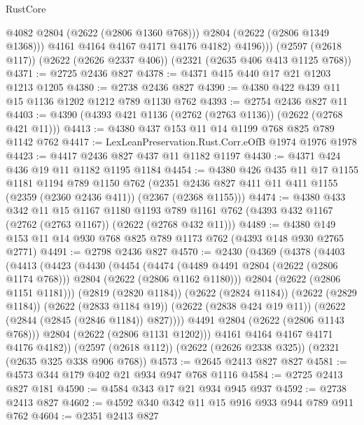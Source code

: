 \begin{lexlean}{RustCore}
\begin{coremodule}
                @4082
                @2804
                (@2622 (@2806 @1360 @768)))
              @2804
              (@2622 (@2806 @1349 @1368)))
            @4161
            @4164
            @4167
            @4171
            @4176
            @4182)
          @4196)))
    (@2597 (@2618 @117))
    (@2622 (@2626 @2337 @406))
    (@2321 (@2635 @406 @413 @1125 @768))
@4371 := @2725 @2436 @827
@4378 := @4371 @415 @440 @17 @21 @1203 @1213 @1205
@4380 := @2738 @2436 @827
@4390 := @4380 @422 @439 @11 @15 @1136 @1202 @1212 @789 @1130 @762
@4393 := @2754 @2436 @827 @11
@4403 := @4390 (@4393 @421 @1136 (@2762 (@2763 @1136)) (@2622 (@2768 @421 @11)))
@4413 := @4380 @437 @153 @11 @14 @1199 @768 @825 @789 @1142 @762
@4417 := LexLeanPreservation.Rust.Corr.eOfB @1974 @1976 @1978
@4423 := @4417 @2436 @827 @437 @11 @1182 @1197
@4430 := @4371 @424 @436 @19 @11 @1182 @1195 @1184
@4454 := @4380
    @426
    @435
    @11
    @17
    @1155
    @1181
    @1194
    @789
    @1150
    @762
    (@2351 @2436 @827 @411 @11 @411 @1155 (@2359 (@2360 @2436 @411)) (@2367 (@2368 @1155)))
@4474 := @4380
    @433
    @342
    @11
    @15
    @1167
    @1180
    @1193
    @789
    @1161
    @762
    (@4393 @432 @1167 (@2762 (@2763 @1167)) (@2622 (@2768 @432 @11)))
@4489 := @4380 @149 @153 @11 @14 @930 @768 @825 @789 @1173 @762 (@4393 @148 @930 @2765 @2771)
@4491 := @2798 @2436 @827
@4570 := @2430
    (@4369
      (@4378
        (@4403
          (@4413
            (@4423
              (@4430
                (@4454
                  (@4474
                    (@4489 @4491 @2804 (@2622 (@2806 @1174 @768)))
                    @2804
                    (@2622 (@2806 @1162 @1180)))
                  @2804
                  (@2622 (@2806 @1151 @1181)))
                (@2819 (@2820 @1184))
                (@2622 (@2824 @1184))
                (@2622 (@2829 @1184))
                (@2622 (@2833 @1184 @19))
                (@2622 (@2838 @424 @19 @11))
                (@2622 (@2844 (@2845 (@2846 @1184)) @827))))
            @4491
            @2804
            (@2622 (@2806 @1143 @768)))
          @2804
          (@2622 (@2806 @1131 @1202)))
        @4161
        @4164
        @4167
        @4171
        @4176
        @4182))
    (@2597 (@2618 @112))
    (@2622 (@2626 @2338 @325))
    (@2321 (@2635 @325 @338 @906 @768))
@4573 := @2645 @2413 @827 @827
@4581 := @4573 @344 @179 @402 @21 @934 @947 @768 @1116
@4584 := @2725 @2413 @827 @181
@4590 := @4584 @343 @17 @21 @934 @945 @937
@4592 := @2738 @2413 @827
@4602 := @4592 @340 @342 @11 @15 @916 @933 @944 @789 @911 @762
@4604 := @2351 @2413 @827

\end{coremodule}
\end{lexlean}
